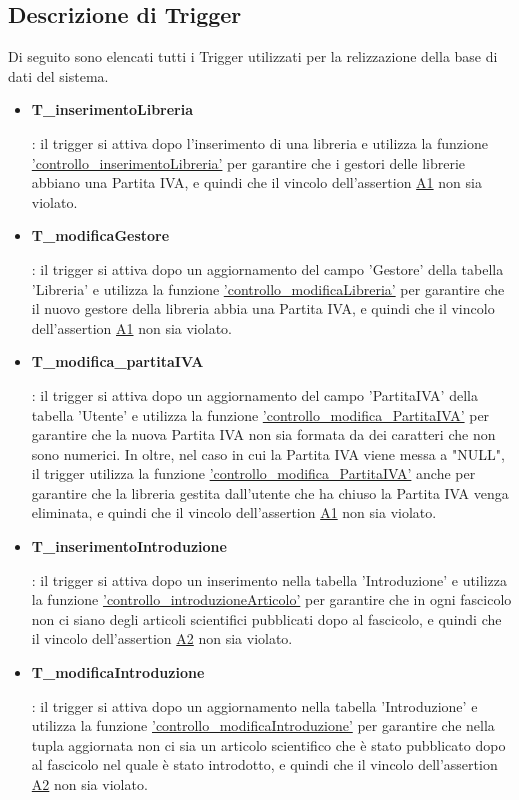 \documentclass{article}
\begin{document}
\subsection{Descrizione di Trigger}
Di seguito sono elencati tutti i Trigger utilizzati per la relizzazione della base di dati del sistema.
\begin{itemize}
    \item \hypertarget{t1}{\textbf{T\_inserimentoLibreria}}: il trigger si attiva dopo l'inserimento di una libreria e utilizza la funzione \hyperlink{f1}{'controllo\_inserimentoLibreria'} per garantire che i gestori delle librerie abbiano una Partita IVA, e quindi che il vincolo dell'assertion \hyperlink{assertion1}{A1} non sia violato.
    
    \item \hypertarget{t2}{\textbf{T\_modificaGestore}}: il trigger si attiva dopo un aggiornamento del campo 'Gestore' della tabella 'Libreria' e utilizza la funzione \hyperlink{f2}{'controllo\_modificaLibreria'} per garantire che il nuovo gestore della libreria abbia una Partita IVA, e quindi che il vincolo dell'assertion \hyperlink{assertion1}{A1} non sia violato. 

    \item \hypertarget{t3}{\textbf{T\_modifica\_partitaIVA}}: il trigger si attiva dopo un aggiornamento del campo 'PartitaIVA' della tabella 'Utente' e utilizza la funzione \hyperlink{f3}{'controllo\_modifica\_PartitaIVA'} per garantire che la nuova Partita IVA non sia formata da dei caratteri che non sono numerici. In oltre, nel caso in cui la Partita IVA viene messa a "NULL", il trigger utilizza la funzione \hyperlink{f3}{'controllo\_modifica\_PartitaIVA'} anche per garantire che la libreria gestita dall'utente che ha chiuso la Partita IVA venga eliminata, e quindi che il vincolo dell'assertion \hyperlink{assertion1}{A1} non sia violato.

    \item \hypertarget{t4}{\textbf{T\_inserimentoIntroduzione}}: il trigger si attiva dopo un inserimento nella tabella 'Introduzione' e utilizza la funzione \hyperlink{f4}{'controllo\_introduzioneArticolo'} per garantire che in ogni fascicolo non ci siano degli articoli scientifici pubblicati dopo al fascicolo, e quindi che il vincolo dell'assertion \hyperlink{assertion2}{A2} non sia violato.

    \item \hypertarget{t5}{\textbf{T\_modificaIntroduzione}}: il trigger si attiva dopo un aggiornamento nella tabella 'Introduzione' e utilizza la funzione \hyperlink{f5}{'controllo\_modificaIntroduzione'} per garantire che nella tupla aggiornata non ci sia un articolo scientifico che è stato pubblicato dopo al fascicolo nel quale è stato introdotto, e quindi che il vincolo dell'assertion \hyperlink{assertion2}{A2} non sia violato.


\end{itemize}
\end{document}
